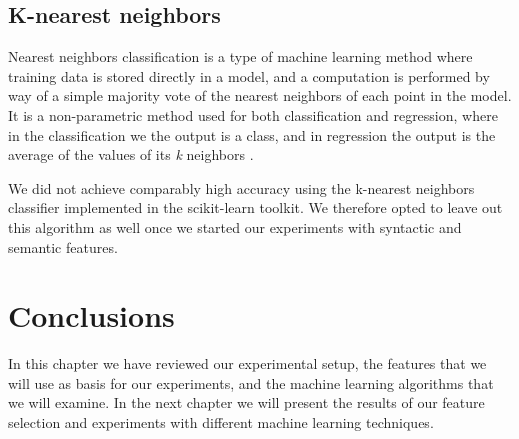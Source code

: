 \subsection{K-nearest neighbors}

Nearest neighbors classification is a type of machine learning method where training data is stored directly in a model, and a computation is performed by way of a simple majority vote of the nearest neighbors of each point in the model. It is a non-parametric method used for both classification and regression, where in the classification we the output is a class, and in regression the output is the average of the values of its \textit{k} neighbors \cite{Altman:92}.

We did not achieve comparably high accuracy using the k-nearest neighbors classifier implemented in the scikit-learn toolkit. We therefore opted to leave out this algorithm as well once we started our experiments with syntactic and semantic features.

\section{Conclusions}

In this chapter we have reviewed our experimental setup, the features that we will use as basis for our experiments, and the machine learning algorithms that we will examine. In the next chapter we will present the results of our feature selection and experiments with different machine learning techniques.
